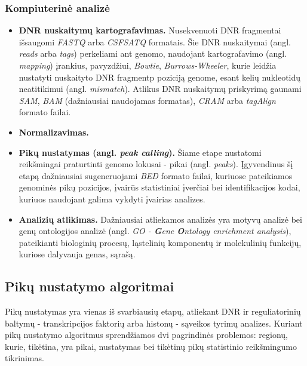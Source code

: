 \documentclass[12pt]{article}
\begin{document}
\subsubsection{Kompiuterinė analizė}
\begin{itemize}
    \item \textbf{DNR nuskaitymų kartografavimas.} Nusekvenuoti DNR 
        fragmentai išsaugomi \emph{FASTQ} arba \emph{CSFSATQ} formatais. Šie DNR
        nuskaitymai (angl. \emph{reads} arba \emph{tags}) perkeliami ant genomo,
        naudojant kartografavimo (angl. \emph{mapping}) įrankius, pavyzdžiui,
        \emph{Bowtie}\cite{ARTICLE6}, \emph{Burrows-Wheeler}, kurie leidžia
        nustatyti nuskaityto DNR fragmentp poziciją genome, esant kelių
        nukleotidų neatitikimui\cite{ARTICLE7} (angl. \emph{mismatch}). Atlikus
        DNR nuskaitymų priskyrimą gaunami \emph{SAM}, \emph{BAM} (dažniausiai
        naudojamas formatas), \emph{CRAM} arba \emph{tagAlign} formato failai.
    \item \textbf{Normalizavimas.} 
    \item \textbf{Pikų nustatymas (angl. \emph{peak calling}).} Šiame etape
        nustatomi reikšmingai praturtinti genomo lokusai - pikai
        (angl. \emph{peaks}). Įgyvendinus šį etapą dažniausiai sugeneruojami
        \emph{BED} formato failai\cite{ARTICLE8}, kuriuose pateikiamos genominės
        pikų pozicijos, įvairūs statistiniai įverčiai bei identifikacijos kodai,
        kuriuos naudojant galima vykdyti įvairias analizes.
    \item \textbf{Analizių atlikimas.} Dažniausiai atliekamos analizės yra
        motyvų analizė bei genų ontologijos analizė\cite{ARTICLE8}
        (angl. \emph{GO - \textbf{G}ene \textbf{O}ntology enrichment analysis}),
        pateikianti biologinių procesų, ląstelinių komponentų ir molekulinių
        funkcijų, kuriose dalyvauja genas, sąrašą.
\end{itemize}


\newpage

\subsection{Pikų nustatymo algoritmai}
Pikų nustatymas yra vienas iš svarbiausių etapų, atliekant DNR ir reguliatorinių
baltymų - transkripcijos faktorių arba histonų - sąveikos tyrimų analizes.
Kuriant pikų nustatymo algoritmus sprendžiamos dvi pagrindinės problemos:
regionų, kurie, tikėtina, yra pikai, nustatymas bei tikėtinų pikų statistinio
reikšmingumo tikrinimas.
\end{document}
